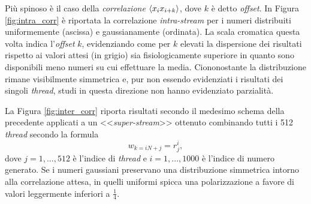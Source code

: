 Più spinoso è il caso della \textit{correlazione} $\braket{x_i x_{i+k}}$, dove $k$ è detto \textit{offset}. In Figura \ref{fig:intra_corr} è riportata la correlazione \textit{intra-stream} per i numeri distribuiti uniformemente (ascissa) e gaussianamente (ordinata). La scala cromatica questa volta indica l'\textit{offset} $k$, evidenziando come per $k$ elevati la dispersione dei risultati rispetto ai valori attesi (in grigio) sia fisiologicamente superiore in quanto sono disponibili meno numeri su cui effettuare la media. Ciononostante la distribuzione rimane visibilmente simmetrica e, pur non essendo evidenziati i risultati dei singoli \textit{thread}, studi in questa direzione non hanno evidenziato parzialità.

La Figura \ref{fig:inter_corr} riporta risultati secondo il medesimo schema della precedente applicati a un <<\textit{super-stream}>> ottenuto combinando tutti i 512 \textit{thread} secondo la formula
\begin{equation}
    w_{k=iN+j} = r_j^i,
    \label{eq:superstream}
\end{equation}
dove $j=1,...,512$ è l'indice di \textit{thread} e $i=1,...,1000$ è l'indice di numero generato. Se i numeri gaussiani preservano una distribuzione simmetrica intorno alla correlazione attesa, in quelli uniformi spicca una polarizzazione a favore di valori leggermente inferiori a $\frac{1}{4}$.

